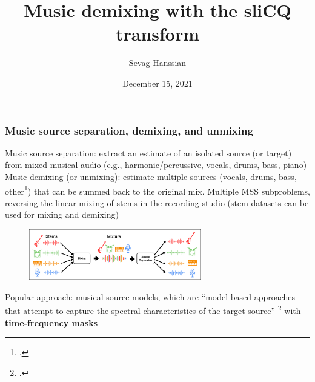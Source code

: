 \documentclass[usenames,dvipsnames]{beamer}
\title{Music demixing with the sliCQ transform}
\author{Sevag Hanssian}
\date{December 15, 2021}
\begin{document}
\begin{frame}
\maketitle
\end{frame}

\begin{frame}
	\frametitle{Music source separation, demixing, and unmixing}
	Music source separation: extract an estimate of an isolated source (or target) from mixed musical audio (e.g., harmonic/percussive, vocals, drums, bass, piano)\\
	Music demixing (or unmixing): estimate multiple sources (vocals, drums, bass, other\footcite{musdb18hq}) that can be summed back to the original mix. Multiple MSS subproblems, reversing the linear mixing of stems in the recording studio (stem datasets can be used for mixing and demixing)
	\begin{figure}[ht]
		\centering
		\vspace{-0.25em}
		\includegraphics[width=7.5cm]{./images-mss/mixdemix.png}
		\vspace{-0.75em}
	\end{figure}
	Popular approach: musical source models, which are ``model-based approaches that attempt to capture the spectral characteristics of the target source'' \footcite[36]{musicsepgood} with \textbf{time-frequency masks}
\end{frame}
\end{document}
